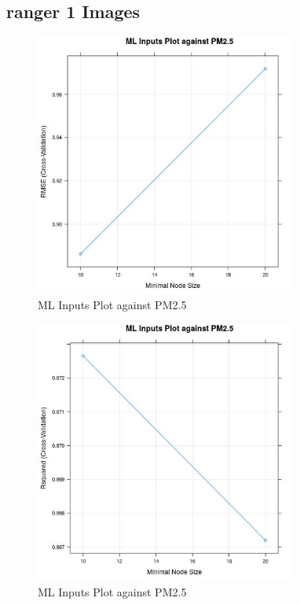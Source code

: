 
\subsection{ranger 1 Images} 
 

\begin{figure} 
\centering  
\includegraphics[width=0.77\textwidth]{Code_Outputs/ML_report_task_1ranger_RMSEvNVariables.jpg} 
\caption{\label{fig:ML_report_task_1rangerRMSEvNVariables}ML Inputs Plot against PM2.5} 
\end{figure} 
 

\begin{figure} 
\centering  
\includegraphics[width=0.77\textwidth]{Code_Outputs/ML_report_task_1ranger_RsquaredvNVariables.jpg} 
\caption{\label{fig:ML_report_task_1rangerRsquaredvNVariables}ML Inputs Plot against PM2.5} 
\end{figure} 
 

